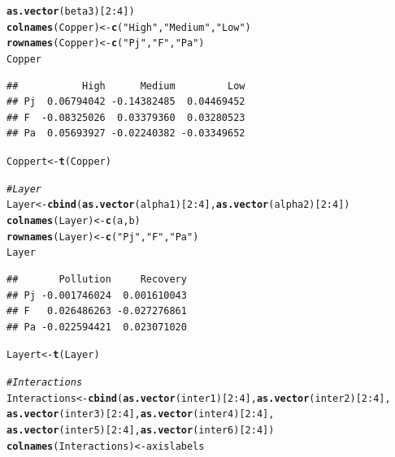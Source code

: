 \documentclass{article}\usepackage[]{graphicx}\usepackage[]{color}
\makeatletter
\newcommand{\hlnum}[1]{\textcolor[rgb]{0.686,0.059,0.569}{#1}}%
\newcommand{\hlstr}[1]{\textcolor[rgb]{0.192,0.494,0.8}{#1}}%
\newcommand{\hlcom}[1]{\textcolor[rgb]{0.678,0.584,0.686}{\textit{#1}}}%
\newcommand{\hlopt}[1]{\textcolor[rgb]{0,0,0}{#1}}%
\newcommand{\hlstd}[1]{\textcolor[rgb]{0.345,0.345,0.345}{#1}}%
\newcommand{\hlkwb}[1]{\textcolor[rgb]{0.69,0.353,0.396}{#1}}%
\newcommand{\hlkwd}[1]{\textcolor[rgb]{0.737,0.353,0.396}{\textbf{#1}}}%
\newenvironment{kframe}{%
 \def\at@end@of@kframe{}%
 \ifinner\ifhmode%
  \def\at@end@of@kframe{\end{minipage}}%
  \begin{minipage}{\columnwidth}%
 \fi\fi%
 \def\FrameCommand##1{\hskip\@totalleftmargin \hskip-\fboxsep
 \colorbox{shadecolor}{##1}\hskip-\fboxsep
     \hskip-\linewidth \hskip-\@totalleftmargin \hskip\columnwidth}%
 \MakeFramed {\advance\hsize-\width
   \@totalleftmargin\z@ \linewidth\hsize
   \@setminipage}}%
 {\par\unskip\endMakeFramed%
 \at@end@of@kframe}
\newenvironment{knitrout}{}{} %
\makeatother
\begin{document}
\begin{knitrout}
\begin{kframe}
\begin{alltt}
                \hlkwd{as.vector}\hlstd{(beta3)[}\hlnum{2}\hlopt{:}\hlnum{4}\hlstd{])}
\hlkwd{colnames}\hlstd{(Copper)} \hlkwb{<-} \hlkwd{c}\hlstd{(}\hlstr{"High"}\hlstd{,} \hlstr{"Medium"}\hlstd{,} \hlstr{"Low"}\hlstd{)}
\hlkwd{rownames}\hlstd{(Copper)} \hlkwb{<-} \hlkwd{c}\hlstd{(}\hlstr{"Pj"}\hlstd{,} \hlstr{"F"}\hlstd{,} \hlstr{"Pa"}\hlstd{)}
\hlstd{Copper}
\end{alltt}
\begin{verbatim}
##           High      Medium         Low
## Pj  0.06794042 -0.14382485  0.04469452
## F  -0.08325026  0.03379360  0.03280523
## Pa  0.05693927 -0.02240382 -0.03349652
\end{verbatim}
\begin{alltt}
\hlstd{Coppert}\hlkwb{<-}\hlkwd{t}\hlstd{(Copper)}

\hlcom{#Layer}
\hlstd{Layer} \hlkwb{<-} \hlkwd{cbind}\hlstd{(}\hlkwd{as.vector}\hlstd{(alpha1)[}\hlnum{2}\hlopt{:}\hlnum{4}\hlstd{],} \hlkwd{as.vector}\hlstd{(alpha2)[}\hlnum{2}\hlopt{:}\hlnum{4}\hlstd{])}
\hlkwd{colnames}\hlstd{(Layer)} \hlkwb{<-} \hlkwd{c}\hlstd{(a, b)}
\hlkwd{rownames}\hlstd{(Layer)} \hlkwb{<-} \hlkwd{c}\hlstd{(}\hlstr{"Pj"}\hlstd{,} \hlstr{"F"}\hlstd{,} \hlstr{"Pa"}\hlstd{)}
\hlstd{Layer}
\end{alltt}
\begin{verbatim}
##       Pollution     Recovery
## Pj -0.001746024  0.001610043
## F   0.026486263 -0.027276861
## Pa -0.022594421  0.023071020
\end{verbatim}
\begin{alltt}
\hlstd{Layert}\hlkwb{<-}\hlkwd{t}\hlstd{(Layer)}

\hlcom{#Interactions}
\hlstd{Interactions} \hlkwb{<-} \hlkwd{cbind}\hlstd{(}\hlkwd{as.vector}\hlstd{(inter1)[}\hlnum{2}\hlopt{:}\hlnum{4}\hlstd{],} \hlkwd{as.vector}\hlstd{(inter2)[}\hlnum{2}\hlopt{:}\hlnum{4}\hlstd{],}
                      \hlkwd{as.vector}\hlstd{(inter3)[}\hlnum{2}\hlopt{:}\hlnum{4}\hlstd{],} \hlkwd{as.vector}\hlstd{(inter4)[}\hlnum{2}\hlopt{:}\hlnum{4}\hlstd{],}
                      \hlkwd{as.vector}\hlstd{(inter5)[}\hlnum{2}\hlopt{:}\hlnum{4}\hlstd{],} \hlkwd{as.vector}\hlstd{(inter6)[}\hlnum{2}\hlopt{:}\hlnum{4}\hlstd{])}
\hlkwd{colnames}\hlstd{(Interactions)} \hlkwb{<-} \hlstd{axislabels}
\end{alltt}



\end{kframe}
\end{knitrout}
\end{document}
